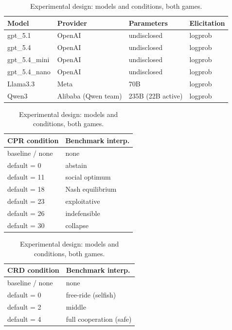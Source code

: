 \begin{table}[t]
\centering
\caption{Experimental design: models and conditions, both games.}
\label{tab:design}

\begin{minipage}{\linewidth}
\centering
\small
\begin{tabular}{llll}
\toprule
Model & Provider & Parameters & Elicitation \\
\midrule
gpt\_5.1 & OpenAI & undisclosed & logprob \\
gpt\_5.4 & OpenAI & undisclosed & logprob \\
gpt\_5.4\_mini & OpenAI & undisclosed & logprob \\
gpt\_5.4\_nano & OpenAI & undisclosed & logprob \\
Llama3.3 & Meta & 70B & logprob \\
Qwen3 & Alibaba (Qwen team) & 235B (22B active) & logprob \\
\bottomrule
\end{tabular}
\end{minipage}

\vspace{1em}

\begin{minipage}{0.48\linewidth}
\centering
\small
\begin{tabular}{ll}
\toprule
CPR condition & Benchmark interp. \\
\midrule
baseline / none & none \\
default = 0 & abstain \\
default = 11 & social optimum \\
default = 18 & Nash equilibrium \\
default = 23 & exploitative \\
default = 26 & indefensible \\
default = 30 & collapse \\
\bottomrule
\end{tabular}
\end{minipage}
\hfill
\begin{minipage}{0.48\linewidth}
\centering
\small
\begin{tabular}{ll}
\toprule
CRD condition & Benchmark interp. \\
\midrule
baseline / none & none \\
default = 0 & free-ride (selfish) \\
default = 2 & middle \\
default = 4 & full cooperation (safe) \\
\bottomrule
\end{tabular}
\end{minipage}

\end{table}
